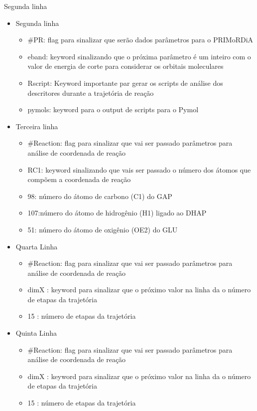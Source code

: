 \documentclass[a4paper,11pt]{refart}
\begin{document}
Segunda linha
\begin{itemize}
	\item Segunda linha
	\begin{itemize}
	\item \#PR:     flag para sinalizar que serão dados parâmetros para o PRIMoRDiA
	\item eband:   keyword sinalizando que o próxima parâmetro é um inteiro com o valor de energia de corte para considerar os orbitais moleculares
	\item Rscript: Keyword importante par gerar os scripts de análise dos descritores durante a trajetória de reação
	\item pymols:  keyword para o output de scripts para o Pymol
	\end{itemize}
	\item Terceira linha
	\begin{itemize}
	\item \#Reaction: flag para sinalizar que vai ser passado parâmetros para análise de coordenada de reação
	\item RC1: keyword sinalizando que vais ser passado o número dos átomos que compõem a coordenada de reação
	\item 98: número do átomo de carbono (C1) do GAP 
	\item 107:número do átomo de hidrogênio (H1) ligado ao DHAP
	\item 51: número do átomo de oxigênio (OE2) do GLU
	\end{itemize}
	\item Quarta Linha
	\begin{itemize}
	\item \#Reaction: flag para sinalizar que vai ser passado parâmetros para análise de coordenada de reação
	\item dimX     : keyword para sinalizar que o próximo valor na linha da o número de etapas da trajetória
	\item 15       : número de etapas da trajetória
	\end{itemize}
	\item Quinta Linha 
	\begin{itemize}
	\item \#Reaction: flag para sinalizar que vai ser passado parâmetros para análise de coordenada de reação
	\item dimX      : keyword para sinalizar que o próximo valor na linha da o número de etapas da trajetória
	\item 15        : número de etapas da trajetória

\end{itemize}
\end{itemize}
\end{document}
